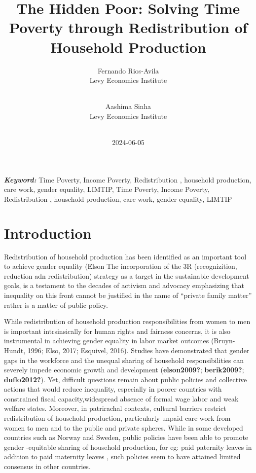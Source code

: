 \documentclass[
  11pt,
]{article}
\title{The Hidden Poor: Solving Time Poverty through Redistribution of
Household Production}
\author{
Fernando Rios-Avila\\
Levy Economics Institute\\
\\
\and 
Aashima Sinha\\
Levy Economics Institute\\
\\
}
\date{2024-06-05}
\begin{document}
\def\spacingset#1{\renewcommand{\baselinestretch}%
{#1}\small\normalsize} \spacingset{1}


\maketitle
\begin{abstract}
\lipsum[1]
\end{abstract}
 
\vspace{.2in}

\textbf{\textit{Keyword: }}
    Time Poverty, Income Poverty, Redistribution , household production,
care work, gender equality, LIMTIP, 
    Time Poverty, Income Poverty, Redistribution , household production,
care work, gender equality, LIMTIP 


\thispagestyle{empty}
\clearpage{}
\newpage
\spacingset{1.2} %
\section{Introduction}\label{introduction}

Redistribution of household production has been identified as an
important tool to achieve gender equality (Elson The incorporation of
the 3R (recognizition, reduction adn redistribution) strategy as a
target in the sustainable development goals, is a testament to the
decades of activism and advocacy emphasizing that inequality on this
front cannot be justified in the name of ``private family matter''
rather is a matter of public policy.

While redistribution of household production responsibilities from women
to men is important intrsinsically for human rights and fairness
concerns, it is also instrumental in achieving gender equality in labor
market outcomes (Bruyn-Hundt, 1996; Elso, 2017; Esquivel, 2016). Studies
have demonstrated that gender gaps in the workforce and the unequal
sharing of household responsibilities can severely impede economic
growth and development (\textbf{elson2009?}; \textbf{berik2009?};
\textbf{duflo2012?}). Yet, difficult questions remain about public
policies and collective actions that would reduce inequality, especially
in poorer countries with constrained fiscal capacity,widespread absence
of formal wage labor and weak welfare states. Moreover, in patrirachal
contexts, cultural barriers restrict redistribution of household
production, particularly unpaid care work from women to men and to the
public and private spheres. While in some developed countries such as
Norway and Sweden, public policies have been able to promote gender
-equitable sharing of household production, for eg: paid paternity
leaves in addition to paid maternity leaves , such policies seem to have
attained limited consensus in other countries.
\end{document}
